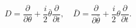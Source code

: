 \begin{equation}\label{FlatDer}
  D=\frac{\partial}{\partial\theta}+
\frac{i}{2}\bar\theta\frac{\partial}{\partial t},\quad
\bar D=\frac{\partial}{\partial\bar\theta}+
\frac{i}{2}\theta\frac{\partial}{\partial t}.
\end{equation}

